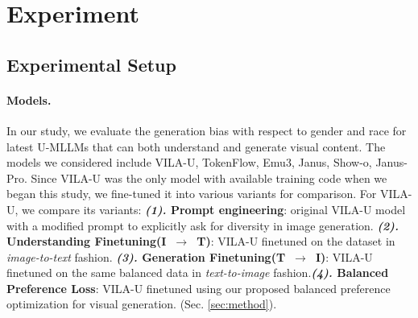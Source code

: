 
\vspace{-1em}
\section{Experiment}

\subsection{Experimental Setup}
\label{subsec:exp_setup}



\paragraph{Models.}
In our study, we evaluate the generation bias with respect to gender and race for latest U-MLLMs that can both understand and generate visual content. The models we considered include VILA-U\cite{wu2024vila}, TokenFlow\cite{qu2024tokenflow}, Emu3\cite{wang2024emu3}, Janus\cite{wu2024janus}, Show-o\cite{xie2024showo}, Janus-Pro\cite{chen2025januspro}. Since VILA-U was the only model with available training code when we began this study, we fine-tuned it into various variants for comparison. For VILA-U, we compare its variants: \textbf{\emph{(1). }Prompt engineering}: original VILA-U model with a modified prompt to explicitly ask for diversity in image generation. \textbf{\emph{(2). }Understanding Finetuning(\textsf{I~$\rightarrow$~T})}: VILA-U finetuned on the dataset in \emph{image-to-text} fashion.  \textbf{\emph{(3). }Generation Finetuning(\textsf{T~$\rightarrow$~I})}: VILA-U finetuned on the same balanced data in \emph{text-to-image} fashion.\textbf{\emph{(4). }Balanced Preference Loss}: VILA-U finetuned using our proposed balanced preference optimization for visual generation. (Sec. \ref{sec:method}).
\vspace{-1.5em}
